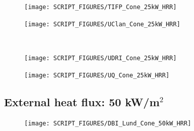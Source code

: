 \documentclass{book}
\begin{document}
\begin{landscape}
\begin{minipage}{0.65\textwidth}
\begin{figure}[H]
{\texttt{[image: SCRIPT\_FIGURES/TIFP\_Cone\_25kW\_HRR]}}\\
\end{figure}
\end{minipage}
\begin{minipage}{0.35\textwidth}
\begin{figure}[H]
{\texttt{[image: SCRIPT\_FIGURES/UClan\_Cone\_25kW\_HRR]}}\\
\end{figure}
\end{minipage}\\

\begin{minipage}{0.65\textwidth}
\begin{figure}[H]
{\texttt{[image: SCRIPT\_FIGURES/UDRI\_Cone\_25kW\_HRR]}}\\
\end{figure}
\end{minipage}
\begin{minipage}{0.35\textwidth}
\begin{figure}[H]
{\texttt{[image: SCRIPT\_FIGURES/UQ\_Cone\_25kW\_HRR]}}\\
\end{figure}
\end{minipage}
\vfill


\newpage
\subsection{External heat flux: 50 kW/m$^2$}
\begin{minipage}{0.65\textwidth}
\begin{figure}[H]
{\texttt{[image: SCRIPT\_FIGURES/DBI\_Lund\_Cone\_50kW\_HRR]}}\\
\end{figure}
\end{minipage}
\vfill

\newpage

\end{landscape}
\end{document}
